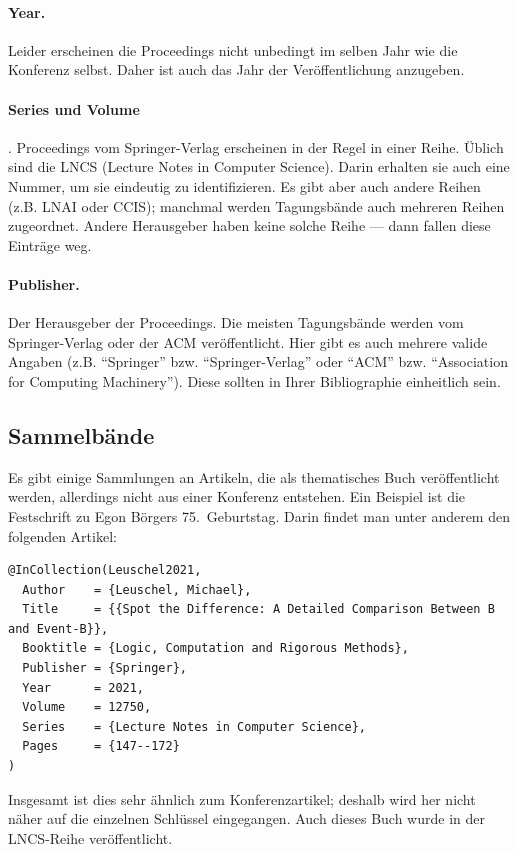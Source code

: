 \paragraph{Year.} Leider erscheinen die Proceedings nicht unbedingt im selben Jahr wie die Konferenz selbst.
Daher ist auch das Jahr der Veröffentlichung anzugeben.
\paragraph{Series und Volume}. Proceedings vom Springer-Verlag erscheinen in der Regel in einer Reihe. 
Üblich sind die LNCS (Lecture Notes in Computer Science). Darin erhalten sie auch eine Nummer, um sie eindeutig zu identifizieren.
Es gibt aber auch andere Reihen (z.B. LNAI oder CCIS); manchmal werden Tagungsbände auch mehreren Reihen zugeordnet.
Andere Herausgeber haben keine solche Reihe --- dann fallen diese Einträge weg.
\paragraph{Publisher.} Der Herausgeber der Proceedings.
Die meisten Tagungsbände werden vom Springer-Verlag oder der ACM veröffentlicht.
Hier gibt es auch mehrere valide Angaben (z.B. \enquote{Springer} bzw. \enquote{Springer-Verlag} oder \enquote{ACM} bzw. \enquote{Association for Computing Machinery}).
Diese sollten in Ihrer Bibliographie einheitlich sein.



\subsection{Sammelbände}

Es gibt einige Sammlungen an Artikeln, die als thematisches Buch veröffentlicht werden,
allerdings nicht aus einer Konferenz entstehen.
Ein Beispiel ist die Festschrift zu Egon Börgers 75.\ Geburtstag.
Darin findet man unter anderem den folgenden Artikel:

\begin{verbatim}
@InCollection(Leuschel2021,
  Author    = {Leuschel, Michael},
  Title     = {{Spot the Difference: A Detailed Comparison Between B and Event-B}},
  Booktitle = {Logic, Computation and Rigorous Methods},
  Publisher = {Springer},
  Year      = 2021,
  Volume    = 12750,
  Series    = {Lecture Notes in Computer Science},
  Pages     = {147--172}
)
\end{verbatim}

Insgesamt ist dies sehr ähnlich zum Konferenzartikel; deshalb wird her nicht näher auf die einzelnen Schlüssel eingegangen.
Auch dieses Buch wurde in der LNCS-Reihe veröffentlicht.

